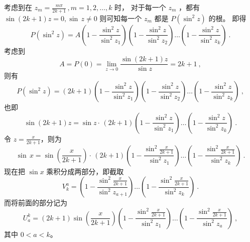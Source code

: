 考虑到在 $z_m=\frac{m\pi}{2k+1}\,,m=1,2,\dots,k $ 时， 对于每一个 $z_m$ ，都有 $ \sin(2k+1)z=0,\sin\,z\ne 0$
则可知每一个 $z_m$ 都是 $P(\sin^2z)$ 的根。 即得
\begin{equation}
P(\sin^2z)=A(1-\frac{\sin^2z}{\sin^2z_1})(1-\frac{\sin^2z}{\sin^2z_2})\dots(1-\frac{\sin^2z}{\sin^2z_k})~.
\end{equation}
考虑到
\begin{equation}
A=P(0)=\lim_{z\rightarrow0}\frac{\sin(2k+1)z}{\sin z}=2k+1~,
\end{equation}
则有
\begin{equation}
P(\sin^2z)=(2k+1)(1-\frac{\sin^2z}{\sin^2z_1})(1-\frac{\sin^2z}{\sin^2z_2})\dots(1-\frac{\sin^2z}{\sin^2z_k})~,
\end{equation}
也即
\begin{equation}
\sin(2k+1)z=\sin z\cdot\,(2k+1)(1-\frac{\sin^2z}{\sin^2z_1})\dots(1-\frac{\sin^2z}{\sin^2z_k})~.
\end{equation}
令 $z=\frac{x}{2k+1}$，则为
\begin{equation}
\sin\,x=\sin(\frac x{2k+1})\cdot\,(2k+1)(1-\frac{\sin^2\frac x{2k+1}}{\sin^2z_1})\dots(1-\frac{\sin^2\frac x{2k+1}}{\sin^2z_k})~.
\end{equation}
现在把 $\sin x$ 乘积分成两部分，即截取
\begin{equation}
V^a_k=(1-\frac{\sin^2\frac x{2k+1}}{\sin^2z_{a+1}})\dots(1-\frac{\sin^2\frac x{2k+1}}{\sin^2z_k})~.
\end{equation}
而将前面的部分记为
\begin{equation}
U^k_a=(2k+1)\sin(\frac x{2k+1})(1-\frac{\sin^2\frac x{2k+1}}{\sin^2z_1})\dots(1-\frac{\sin^2\frac x{2k+1}}{\sin^2z_{a}})~,
\end{equation}
其中 $0<a<k $。

